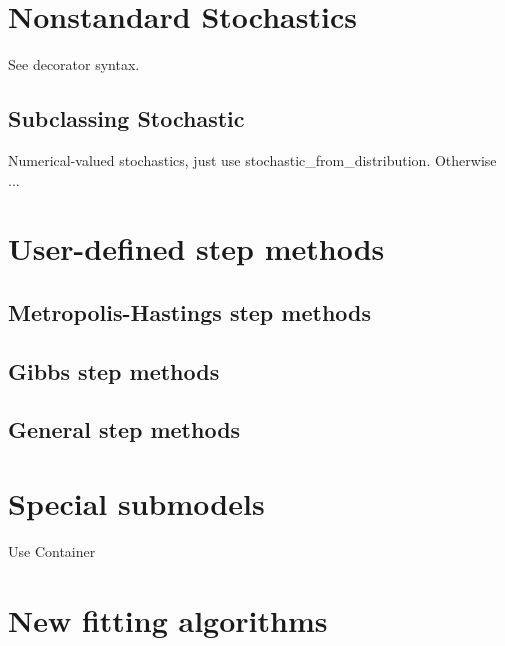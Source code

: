 \hypertarget{nonstandard}{}
\section*{Nonstandard Stochastics} \label{nonstandard}

See decorator syntax.

\subsection*{Subclassing Stochastic}

Numerical-valued stochastics, just use stochastic_from_distribution. Otherwise ...


\hypertarget{custom-stepper}{}
\section*{User-defined step methods} \label{custom-stepper}

\hypertarget{user-metro}{}
\subsection*{Metropolis-Hastings step methods} \label{user-metro}

\hypertarget{user-gibbs}{}
\subsection*{Gibbs step methods} \label{user-gibbs}

\hypertarget{user-gen}{}
\subsection*{General step methods} \label{user-gen}

\hypertarget{special-submodel}{}
\section*{Special submodels} \label{special-submodel}

Use Container


\hypertarget{custom-model}{}
\section*{New fitting algorithms} \label{custom-model}

